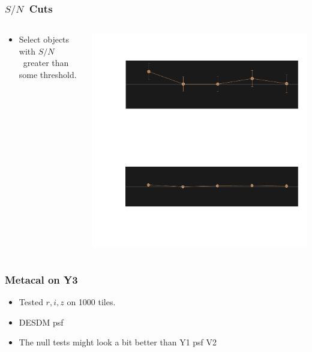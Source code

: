 \documentclass{beamer}
\newcommand{\snr}{$S/N$}
\begin{document}
\frame
{
    \frametitle{\snr\ Cuts}
 

    \begin{columns}
        \begin{column}{0.4\textwidth}
            \begin{itemize}
                \item Select objects with \snr\ greater than some threshold.
            \end{itemize}
        \end{column}
        \begin{column}{0.6\textwidth}
            \begin{center}
            \includegraphics[width=\textwidth]{mc-select-bias-thresh-inv.pdf}
                \newline
            \end{center}
        \end{column}
    \end{columns}


}



\frame
{
    \frametitle{Metacal on Y3}

 
    \begin{itemize}

        \item Tested $r,i,z$ on 1000 tiles.

        \item DESDM psf

        \item The null tests might look a bit better than Y1 psf V2
            

    \end{itemize}

}
\end{document}
